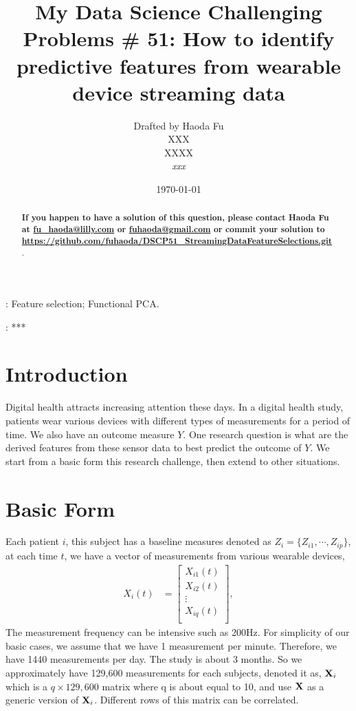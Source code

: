\documentclass[12pt]{article}
\def\bX{{\bf X}}
\begin{document}
\title
{\bf My Data Science Challenging Problems \# 51: How to identify predictive features from wearable device streaming data}
\author
{
Drafted by Haoda Fu\\
XXX \\
XXXX \\
\textsl{xxx} }
\date{\today}

\maketitle
\begin{abstract}
\textbf{{\color[rgb]{1,0,0} If you happen to have a solution of this question, please contact Haoda Fu at \href{mailto:fu\_haoda@lilly.com }{fu\_haoda@lilly.com} or  \href{mailto:ffuhaoda@gmail.com}{fuhaoda@gmail.com}  or commit your solution to \url{https://github.com/fuhaoda/DSCP51_StreamingDataFeatureSelections.git} }
}. 

\end{abstract}
: Feature selection; Functional PCA.

: ***
\section{Introduction}
Digital health attracts increasing attention these days. In a digital health study,  patients wear various devices with different types of measurements for a period of time. We also have an outcome measure $Y$. One research question is what are the derived features from these sensor data to best predict the outcome of $Y$. We start from a basic form this research challenge, then extend to other situations.
\section{Basic Form}
Each patient $i$, this subject has a baseline measures denoted as $Z_i=\{Z_{i1}, \cdots, Z_{ip}\}$, at each time $t$, we have a vector of measurements from various wearable devices,
\begin{align*}
X_i(t)&=\left[\begin{array}{c}
X_{i1}(t)	\\
X_{i2}(t)	\\
\vdots	\\
X_{iq}(t)	\\
\end{array}\right],
\end{align*}
The measurement frequency can be intensive such as 200Hz. For simplicity of our basic cases, we assume that we have 1 measurement per minute. Therefore, we have 1440 measurements per day. The study is about 3 months. So we approximately have 129,600 measurements for each subjects, denoted it as, $\bX_i$ which is a $q \times 129,600$ matrix where q is about equal to 10, and use $\bX$ as a generic version of $\bX_i$. Different rows of this matrix can be correlated. 
\end{document}
